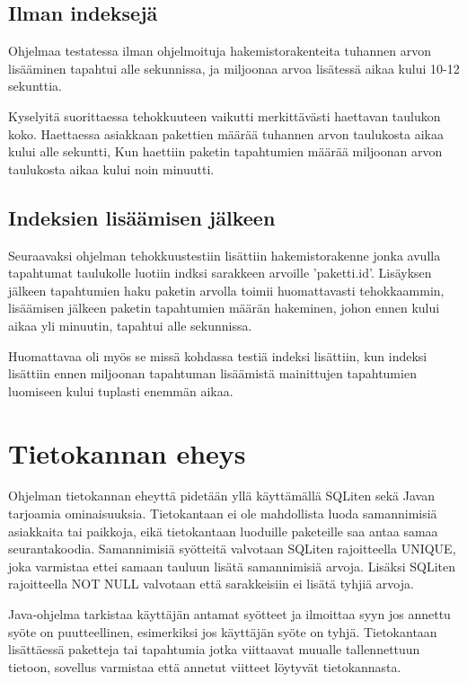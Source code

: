 \documentclass[11pt,a4paper]{article}
\begin{document}
\subsection*{Ilman indeksejä}
Ohjelmaa testatessa ilman ohjelmoituja hakemistorakenteita tuhannen arvon lisääminen tapahtui alle sekunnissa, ja miljoonaa arvoa lisätessä aikaa kului 10-12 sekunttia. 

Kyselyitä suorittaessa tehokkuuteen vaikutti merkittävästi haettavan taulukon koko. Haettaessa asiakkaan pakettien määrää tuhannen arvon taulukosta aikaa kului alle sekuntti, Kun haettiin paketin tapahtumien määrää miljoonan arvon taulukosta aikaa kului noin minuutti.


\subsection*{Indeksien lisäämisen jälkeen}
Seuraavaksi ohjelman tehokkuustestiin lisättiin hakemistorakenne jonka avulla tapahtumat taulukolle luotiin indksi sarakkeen arvoille 'paketti.id'. Lisäyksen jälkeen tapahtumien haku paketin arvolla toimii huomattavasti tehokkaammin, lisäämisen jälkeen paketin tapahtumien määrän hakeminen, johon ennen kului aikaa yli minuutin, tapahtui alle sekunnissa.

Huomattavaa oli myös se missä kohdassa testiä indeksi lisättiin, kun indeksi lisättiin ennen miljoonan tapahtuman lisäämistä mainittujen tapahtumien luomiseen kului tuplasti enemmän aikaa. 

\newpage
\section{Tietokannan eheys}
Ohjelman tietokannan eheyttä pidetään yllä käyttämällä SQLiten sekä Javan tarjoamia ominaisuuksia.
Tietokantaan ei ole mahdollista luoda samannimisiä asiakkaita tai paikkoja, eikä tietokantaan luoduille paketeille saa antaa samaa seurantakoodia. Samannimisiä syötteitä valvotaan SQLiten rajoitteella UNIQUE, joka varmistaa ettei samaan tauluun lisätä samannimisiä arvoja. Lisäksi SQLiten rajoitteella NOT NULL valvotaan että sarakkeisiin ei lisätä tyhjiä arvoja.
 
Java-ohjelma tarkistaa käyttäjän antamat syötteet ja ilmoittaa syyn jos annettu syöte on puutteellinen, esimerkiksi jos käyttäjän syöte on tyhjä. Tietokantaan lisättäessä paketteja tai tapahtumia jotka viittaavat muualle tallennettuun tietoon, sovellus varmistaa että annetut viitteet löytyvät tietokannasta.

\newpage
\end{document}
